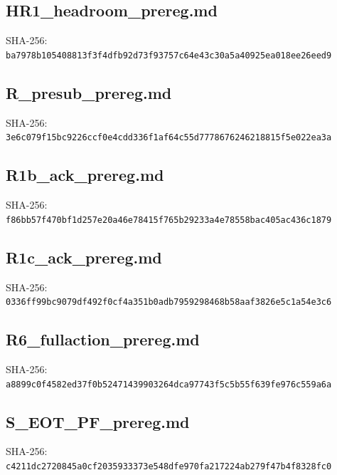 \documentclass[10pt]{article}
\begin{document}
\subsection*{HR1\_headroom\_prereg.md}
\noindent SHA-256: \texttt{\footnotesize ba7978b105408813f3f4dfb92d73f93757c64e43c30a5a40925ea018ee26eed9}\par\medskip

\clearpage
\subsection*{R\_presub\_prereg.md}
\noindent SHA-256: \texttt{\footnotesize 3e6c079f15bc9226ccf0e4cdd336f1af64c55d7778676246218815f5e022ea3a}\par\medskip

\clearpage
\subsection*{R1b\_ack\_prereg.md}
\noindent SHA-256: \texttt{\footnotesize f86bb57f470bf1d257e20a46e78415f765b29233a4e78558bac405ac436c1879}\par\medskip

\clearpage
\subsection*{R1c\_ack\_prereg.md}
\noindent SHA-256: \texttt{\footnotesize 0336ff99bc9079df492f0cf4a351b0adb7959298468b58aaf3826e5c1a54e3c6}\par\medskip

\clearpage
\subsection*{R6\_fullaction\_prereg.md}
\noindent SHA-256: \texttt{\footnotesize a8899c0f4582ed37f0b52471439903264dca97743f5c5b55f639fe976c559a6a}\par\medskip

\clearpage
\subsection*{S\_EOT\_PF\_prereg.md}
\noindent SHA-256: \texttt{\footnotesize c4211dc2720845a0cf2035933373e548dfe970fa217224ab279f47b4f8328fc0}\par\medskip

\clearpage
\end{document}
